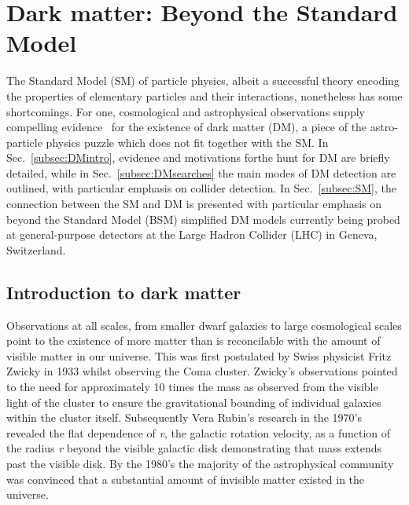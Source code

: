 \chapter{Dark matter: Beyond the Standard Model}
\label{chap:DM}



The Standard Model (SM) of particle physics, albeit a successful theory encoding the properties of elementary particles and their interactions, nonetheless has some shortcomings. For one, cosmological and astrophysical observations supply compelling evidence~\cite{Bertone:2004pz, Feng:2010gw, Porter:2011nv} for the existence of dark matter (DM), a piece of the astro-particle physics puzzle which does not fit together with the SM. In Sec.~\ref{subsec:DMintro}, evidence and motivations forthe hunt for DM are briefly detailed, while in Sec.~\ref{subsec:DMsearches} the main modes of DM detection are outlined, with particular emphasis on collider detection. In Sec.~\ref{subsec:SM}, the connection between the SM and DM is presented with particular emphasis on beyond the Standard Model (BSM) simplified DM models currently being probed at general-purpose detectors at the Large Hadron Collider (LHC) in Geneva, Switzerland.

\section{Introduction to dark matter}
\label{sec:DMintro}

Observations at all scales, from smaller dwarf galaxies to large cosmological scales point to the existence of more matter than is reconcilable with the amount of visible matter in our universe. This was first postulated by Swiss physicist Fritz Zwicky in 1933 whilst observing the Coma cluster. Zwicky's observations pointed to the need for approximately 10 times the mass as observed from the visible light of the cluster to ensure the gravitational bounding of individual galaxies within the cluster itself. Subsequently Vera Rubin's research in the 1970's revealed the flat dependence of \textit{v}, the galactic rotation velocity, as a function of the radius \textit{r} beyond the visible galactic disk demonstrating that mass extends past the visible disk. By the 1980's the majority of the astrophysical community was convinced that a substantial amount of invisible matter existed in the universe. 


